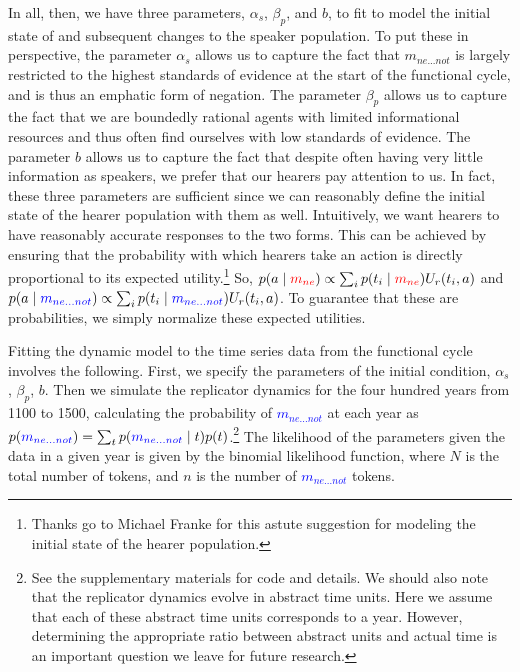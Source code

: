 \documentclass[linguex]{sp}
\theoremstyle{definition} \newtheorem{definition}{Definition}
\begin{document}
In all, then, we have three parameters, $\alpha_{s}$, $\beta_p$, and $b$, to fit to model the initial state of and subsequent changes to the speaker population. To put these in perspective, the parameter $\alpha_{s}$ allows us to capture the fact that \textit{\color{blue} $m_{ne...not}$} is largely restricted to the highest standards of evidence at the start of the functional cycle, and is thus an emphatic form of negation. The parameter $\beta_p$ allows us to capture the fact that we are boundedly rational agents with limited informational resources and thus often find ourselves with low standards of evidence. The parameter $b$ allows us to capture the fact that despite often having very little information as speakers, we prefer that our hearers pay attention to us. In fact, these three parameters are sufficient since we can reasonably define the initial state of the hearer population with them as well. Intuitively, we want hearers to have reasonably accurate responses to the two forms. This can be achieved by ensuring that the probability with which hearers take an action is directly proportional to its expected utility.\footnote{Thanks go to Michael Franke for this astute suggestion for modeling the initial state of the hearer population.} So,  $p(a \mid \textit{\color{red} $m_{ne}$}) \propto \sum_i p(t_i \mid \textit{\color{red} $m_{ne}$}) U_r(t_i, a)$ and $p(a \mid \textit{\color{blue} $m_{ne...not}$}) \propto \sum_i p(t_i \mid \textit{\color{blue} $m_{ne...not}$}) U_r(t_i, a)$. To guarantee that these are probabilities, we simply normalize these expected utilities.

Fitting the dynamic model to the time series data from the functional cycle involves the following. First, we  specify the parameters of the initial condition, $\alpha_{s}$, $\beta_p$, $b$. Then we  simulate the replicator dynamics for the four hundred years from 1100 to 1500, calculating the probability of \textcolor{blue}{$m_{ne...not}$} at each year as $p(\textcolor{blue}{m_{ne...not}}) = \sum_t p(\textcolor{blue}{m_{ne...not}} \mid t) p(t)$.\footnote{See the supplementary materials for code and details. We should also note that the replicator dynamics evolve in abstract time units. Here we assume that each of these abstract time units corresponds to a year. However, determining the appropriate ratio between abstract units and actual time is an important question we leave for future research.}  The likelihood of the parameters given the data in a given year is given by the binomial likelihood function, where $N$ is the total number of tokens, and $n$ is the number of \textcolor{blue}{$m_{ne...not}$} tokens.
\end{document}

